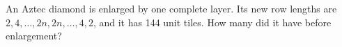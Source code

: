 An Aztec diamond is enlarged by one complete layer. Its new row lengths are $2,4,\ldots,2n,2n,\ldots,4,2$, and it has 144 unit tiles. How many did it have before enlargement?

